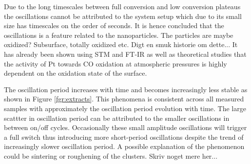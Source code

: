 \documentclass[8.5pt,twoside,twocolumn]{article}
\begin{document}
Due to the long timescales between full conversion and low conversion plateaus the oscillations cannot be attributed to the system setup which due to its small size has timescales on the order of seconds. It is hence concluded that the oscillations is a feature related to the nanoparticles. The particles are maybe oxidized? Subsurface, totally oxidized etc. Digt en smuk historie om dette... 
It has already been shown using STM \cite{Hendriksen2002} and FT-IR \cite{Carlsson2006} as well as theoretical studies \cite{Gong2004} that the activity of Pt towards CO oxidation at atmospheric pressures is highly dependent on the oxidation state of the surface.


The oscillation period increases with time and becomes increasingly less stable as shown in Figure \ref{fgr:extracts}. This phenomena is consistent across all measured samples with approximately the oscillation period evolution with time. The large scattter in oscillation period can be attributed to the smaller oscillations in between on/off cycles. Occasionally these small amplitude oscillations will trigger a full switch thus introducing more short-period oscillations despite the trend of increasingly slower oscillation period. A possible explanation of the phenomenon could be sintering or roughening of the clusters. Skriv noget mere her...




\end{document}
